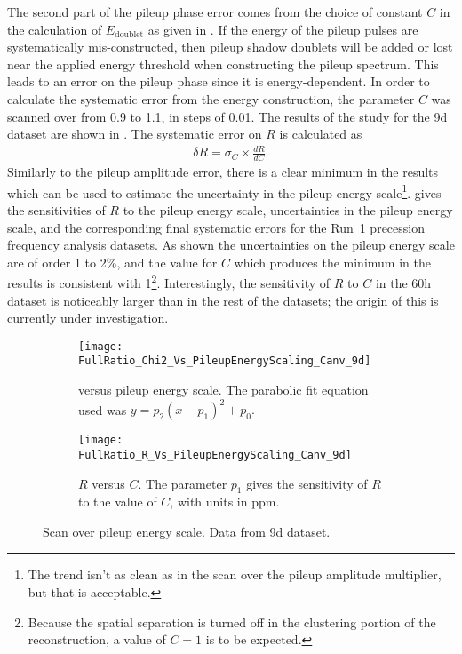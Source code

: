 The second part of the pileup phase error comes from the choice of constant $C$ in the calculation of $E_{\text{doublet}}$ as given in . If the energy of the pileup pulses are systematically mis-constructed, then pileup shadow doublets will be added or lost near the applied energy threshold when constructing the pileup spectrum. This leads to an error on the pileup phase since it is energy-dependent. In order to calculate the systematic error from the energy construction, the parameter $C$ was scanned over from 0.9 to 1.1, in steps of 0.01. The results of the study for the 9d dataset are shown in . The systematic error on $R$ is calculated as 
    \begin{align}
        \delta R = \sigma_{C} \times \frac{dR}{dC}.
    \end{align}
Similarly to the pileup amplitude error, there is a clear minimum in the \chisq results which can be used to estimate the uncertainty in the pileup energy scale\footnote{The trend isn't as clean as in the scan over the pileup amplitude multiplier, but that is acceptable.}.  gives the sensitivities of $R$ to the pileup energy scale, uncertainties in the pileup energy scale, and the corresponding final systematic errors for the Run~1 precession frequency analysis datasets. As shown the uncertainties on the pileup energy scale are of order 1 to 2\%, and the value for $C$ which produces the minimum in the \chisq results is consistent with 1\footnote{Because the spatial separation is turned off in the clustering portion of the reconstruction, a value of $C = 1$ is to be expected.}. Interestingly, the sensitivity of $R$ to $C$ in the 60h dataset is noticeably larger than in the rest of the datasets; the origin of this is currently under investigation.


\begin{figure}
\centering
    \begin{subfigure}[t]{0.45\textwidth}
        \centering
        \texttt{[image: FullRatio\_Chi2\_Vs\_PileupEnergyScaling\_Canv\_9d]}
        \caption{\chisq versus pileup energy scale. The parabolic fit equation used was $y = p_{2}(x - p_{1})^{2} + p_{0}.$}
    \end{subfigure}%
    \hspace{1cm}
    \begin{subfigure}[t]{0.45\textwidth}
        \centering
        \texttt{[image: FullRatio\_R\_Vs\_PileupEnergyScaling\_Canv\_9d]}
        \caption{$R$ versus $C$. The parameter $p_{1}$ gives the sensitivity of $R$ to the value of $C$, with units in ppm.}
    \end{subfigure}
\caption[Pileup energy scale scan]{Scan over pileup energy scale. Data from 9d dataset.}
\label{fig:PEscan}
\end{figure}


